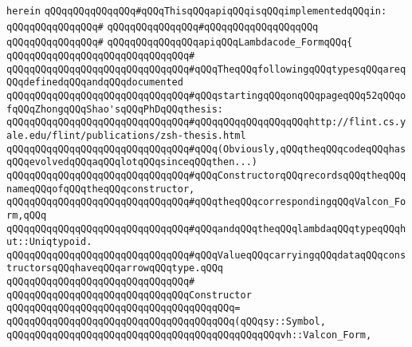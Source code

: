 \verb|herein|\newline
\newline
\verb|qQQqqQQqqQQqqQQq#qQQqThisqQQqapiqQQqisqQQqimplementedqQQqin:|\newline
\verb|qQQqqQQqqQQqqQQq#|\newline
\verb|qQQqqQQqqQQqqQQq#qQQqqQQqqQQqqQQqqQQq|\newline
\verb|qQQqqQQqqQQqqQQq#|\newline
\verb|qQQqqQQqqQQqqQQqapiqQQqLambdacode_FormqQQq{|\newline
\verb|qQQqqQQqqQQqqQQqqQQqqQQqqQQqqQQq#|\newline
\newline
\verb|qQQqqQQqqQQqqQQqqQQqqQQqqQQqqQQq#qQQqTheqQQqfollowingqQQqtypesqQQqareqQQqdefinedqQQqandqQQqdocumented|\newline
\verb|qQQqqQQqqQQqqQQqqQQqqQQqqQQqqQQq#qQQqstartingqQQqonqQQqpageqQQq52qQQqofqQQqZhongqQQqShao'sqQQqPhDqQQqthesis:|\newline
\verb|qQQqqQQqqQQqqQQqqQQqqQQqqQQqqQQq#qQQqqQQqqQQqqQQqqQQqhttp://flint.cs.yale.edu/flint/publications/zsh-thesis.html|\newline
\verb|qQQqqQQqqQQqqQQqqQQqqQQqqQQqqQQq#qQQq(Obviously,qQQqtheqQQqcodeqQQqhasqQQqevolvedqQQqaqQQqlotqQQqsinceqQQqthen...)|\newline
\newline
\newline
\verb|qQQqqQQqqQQqqQQqqQQqqQQqqQQqqQQq#qQQqConstructorqQQqrecordsqQQqtheqQQqnameqQQqofqQQqtheqQQqconstructor,|\newline
\verb|qQQqqQQqqQQqqQQqqQQqqQQqqQQqqQQq#qQQqtheqQQqcorrespondingqQQqValcon_Form,qQQq|\newline
\verb|qQQqqQQqqQQqqQQqqQQqqQQqqQQqqQQq#qQQqandqQQqtheqQQqlambdaqQQqtypeqQQqhut::Uniqtypoid.|\newline
\verb|qQQqqQQqqQQqqQQqqQQqqQQqqQQqqQQq#qQQqValueqQQqcarryingqQQqdataqQQqconstructorsqQQqhaveqQQqarrowqQQqtype.qQQq|\newline
\verb|qQQqqQQqqQQqqQQqqQQqqQQqqQQqqQQq#|\newline
\verb|qQQqqQQqqQQqqQQqqQQqqQQqqQQqqQQqConstructor|\newline
\verb|qQQqqQQqqQQqqQQqqQQqqQQqqQQqqQQqqQQqqQQq=|\newline
\verb|qQQqqQQqqQQqqQQqqQQqqQQqqQQqqQQqqQQqqQQq(qQQqsy::Symbol,|\newline
\verb|qQQqqQQqqQQqqQQqqQQqqQQqqQQqqQQqqQQqqQQqqQQqqQQqvh::Valcon_Form,|\newline

